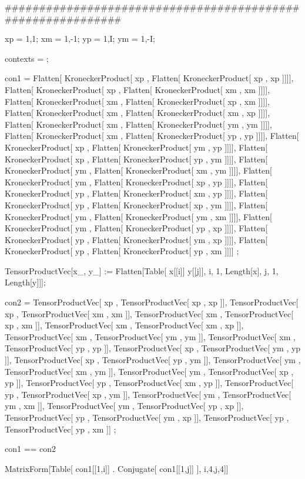############################################################

xp = {1,1}; xm = {1,-1}; yp = {1,I}; ym = {1,-I};

contexts = {};

con1 = {
{
Flatten[ KroneckerProduct[ xp , Flatten[ KroneckerProduct[ xp , xp ]]]],
Flatten[ KroneckerProduct[ xp , Flatten[ KroneckerProduct[ xm , xm ]]]],
Flatten[ KroneckerProduct[ xm , Flatten[ KroneckerProduct[ xp , xm ]]]],
Flatten[ KroneckerProduct[ xm , Flatten[ KroneckerProduct[ xm , xp ]]]]},
{
Flatten[ KroneckerProduct[ xm , Flatten[ KroneckerProduct[ ym , ym ]]]],
Flatten[ KroneckerProduct[ xm , Flatten[ KroneckerProduct[ yp , yp ]]]],
Flatten[ KroneckerProduct[ xp , Flatten[ KroneckerProduct[ ym , yp ]]]],
Flatten[ KroneckerProduct[ xp , Flatten[ KroneckerProduct[ yp , ym ]]]]},
{
Flatten[ KroneckerProduct[ ym , Flatten[ KroneckerProduct[ xm , ym ]]]],
Flatten[ KroneckerProduct[ ym , Flatten[ KroneckerProduct[ xp , yp ]]]],
Flatten[ KroneckerProduct[ yp , Flatten[ KroneckerProduct[ xm , yp ]]]],
Flatten[ KroneckerProduct[ yp , Flatten[ KroneckerProduct[ xp , ym ]]]]},
{
Flatten[ KroneckerProduct[ ym , Flatten[ KroneckerProduct[ ym , xm ]]]],
Flatten[ KroneckerProduct[ ym , Flatten[ KroneckerProduct[ yp , xp ]]]],
Flatten[ KroneckerProduct[ yp , Flatten[ KroneckerProduct[ ym , xp ]]]],
Flatten[ KroneckerProduct[ yp , Flatten[ KroneckerProduct[ yp , xm ]]]]
}} ;


TensorProductVec[x_, y_] :=
  Flatten[Table[
    x[[i]] y[[j]], {i, 1, Length[x]}, {j, 1, Length[y]}]];

con2 = {
{
TensorProductVec[ xp , TensorProductVec[ xp , xp ]],
TensorProductVec[ xp , TensorProductVec[ xm , xm ]],
TensorProductVec[ xm , TensorProductVec[ xp , xm ]],
TensorProductVec[ xm , TensorProductVec[ xm , xp ]]},
{
TensorProductVec[ xm , TensorProductVec[ ym , ym ]],
TensorProductVec[ xm , TensorProductVec[ yp , yp ]],
TensorProductVec[ xp , TensorProductVec[ ym , yp ]],
TensorProductVec[ xp , TensorProductVec[ yp , ym ]]},
{
TensorProductVec[ ym , TensorProductVec[ xm , ym ]],
TensorProductVec[ ym , TensorProductVec[ xp , yp ]],
TensorProductVec[ yp , TensorProductVec[ xm , yp ]],
TensorProductVec[ yp , TensorProductVec[ xp , ym ]]},
{
TensorProductVec[ ym , TensorProductVec[ ym , xm ]],
TensorProductVec[ ym , TensorProductVec[ yp , xp ]],
TensorProductVec[ yp , TensorProductVec[ ym , xp ]],
TensorProductVec[ yp , TensorProductVec[ yp , xm ]]
}} ;

con1 == con2

MatrixForm[Table[ con1[[1,i]] . Conjugate[ con1[[1,j]] ], {i,4},{j,4}]]


